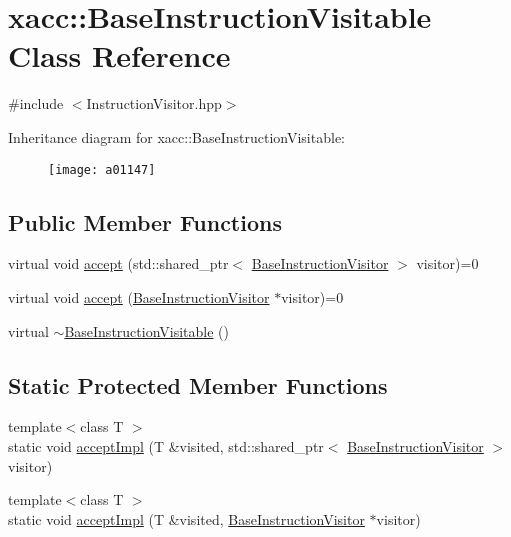 \hypertarget{a01147}{}\section{xacc\+:\+:Base\+Instruction\+Visitable Class Reference}
\label{a01147}


{\ttfamily \#include $<$Instruction\+Visitor.\+hpp$>$}

Inheritance diagram for xacc\+:\+:Base\+Instruction\+Visitable\+:\begin{figure}[H]
\begin{center}
\leavevmode
\texttt{[image: a01147]}
\end{center}
\end{figure}
\subsection*{Public Member Functions}
\begin{DoxyCompactItemize}
\item 
virtual void \hyperlink{a01147_a4ae295a7f83d57c6f1f912adc90274ea}{accept} (std\+::shared\+\_\+ptr$<$ \hyperlink{a01139}{Base\+Instruction\+Visitor} $>$ visitor)=0
\item 
virtual void \hyperlink{a01147_ad6b9ad95c14580cc86ca87cd464262c3}{accept} (\hyperlink{a01139}{Base\+Instruction\+Visitor} $\ast$visitor)=0
\item 
virtual \hyperlink{a01147_a3a291d247b18ea7620dd8d97dfb595f4}{$\sim$\+Base\+Instruction\+Visitable} ()
\end{DoxyCompactItemize}
\subsection*{Static Protected Member Functions}
\begin{DoxyCompactItemize}
\item 
{\footnotesize template$<$class T $>$ }\\static void \hyperlink{a01147_a2f18b9fcb48f42d190a9f5180b7b59c5}{accept\+Impl} (T \&visited, std\+::shared\+\_\+ptr$<$ \hyperlink{a01139}{Base\+Instruction\+Visitor} $>$ visitor)
\item 
{\footnotesize template$<$class T $>$ }\\static void \hyperlink{a01147_a80c7bb995faa54644f822fa48176c6cb}{accept\+Impl} (T \&visited, \hyperlink{a01139}{Base\+Instruction\+Visitor} $\ast$visitor)
\end{DoxyCompactItemize}


